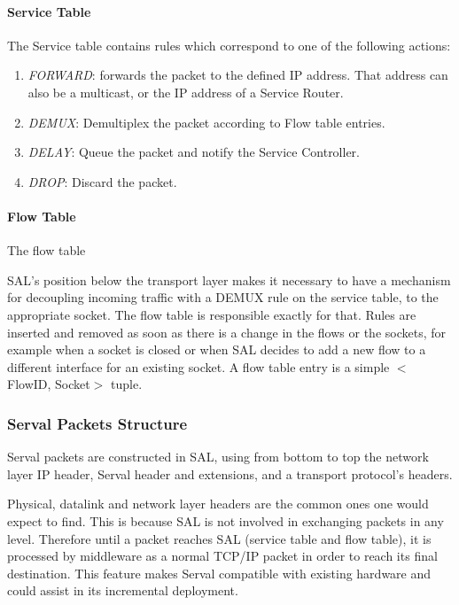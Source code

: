 \paragraph{Service Table} The Service table contains rules which correspond to one of the following actions:
\begin{enumerate} \itemsep1pt \parskip0pt 
  \item \emph{FORWARD}: forwards the packet to the defined IP address.
  That address can also be a multicast, or the IP address of a Service Router. 
  \item \emph{DEMUX}: Demultiplex the packet according to Flow table entries.
  \item \emph{DELAY}: Queue the packet and notify the Service Controller.
  \item \emph{DROP}: Discard the packet.
\end{enumerate}

\paragraph{Flow Table} The flow table 

SAL's position below the transport layer makes it necessary to have a mechanism for decoupling incoming traffic with a DEMUX rule on the service table, to the appropriate socket.
The flow table is responsible exactly for that.
Rules are inserted and removed as soon as there is a change in the flows or the sockets, for example when a socket is closed or when SAL decides to add a new flow to a different interface for an existing socket.
A flow table entry is a simple $<$FlowID, Socket$>$ tuple.




\subsubsection{Serval Packets Structure}
Serval packets are constructed in SAL, using from bottom to top the network layer IP header, Serval header and extensions, and a transport protocol's headers.

Physical, datalink and network layer headers are the common ones one would expect to find.
This is because SAL is not involved in exchanging packets in any level.
Therefore until a packet reaches SAL (service table and flow table), it is processed by middleware as a normal TCP/IP packet in order to reach its final destination.
This feature makes Serval compatible with existing hardware and could assist in its incremental deployment.

